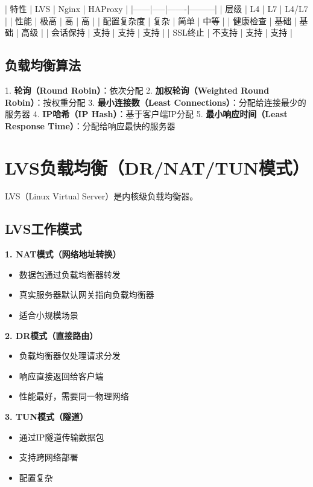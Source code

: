 \documentclass[12pt,UTF8]{ctexbook}
\begin{document}
| 特性 | LVS | Nginx | HAProxy |
|------|-----|-------|---------|
| 层级 | L4 | L7 | L4/L7 |
| 性能 | 极高 | 高 | 高 |
| 配置复杂度 | 复杂 | 简单 | 中等 |
| 健康检查 | 基础 | 基础 | 高级 |
| 会话保持 | 支持 | 支持 | 支持 |
| SSL终止 | 不支持 | 支持 | 支持 |

\subsection*{负载均衡算法}
1. \textbf{轮询（Round Robin）}：依次分配
2. \textbf{加权轮询（Weighted Round Robin）}：按权重分配
3. \textbf{最小连接数（Least Connections）}：分配给连接最少的服务器
4. \textbf{IP哈希（IP Hash）}：基于客户端IP分配
5. \textbf{最小响应时间（Least Response Time）}：分配给响应最快的服务器

\section{LVS负载均衡（DR/NAT/TUN模式）}
\label{sec:lvs}

LVS（Linux Virtual Server）是内核级负载均衡器。

\subsection*{LVS工作模式}

\textbf{1. NAT模式（网络地址转换）}
\begin{itemize}
    \item 数据包通过负载均衡器转发
    \item 真实服务器默认网关指向负载均衡器
    \item 适合小规模场景
\end{itemize}

\textbf{2. DR模式（直接路由）}
\begin{itemize}
    \item 负载均衡器仅处理请求分发
    \item 响应直接返回给客户端
    \item 性能最好，需要同一物理网络
\end{itemize}

\textbf{3. TUN模式（隧道）}
\begin{itemize}
    \item 通过IP隧道传输数据包
    \item 支持跨网络部署
    \item 配置复杂
\end{itemize}
\end{document}
